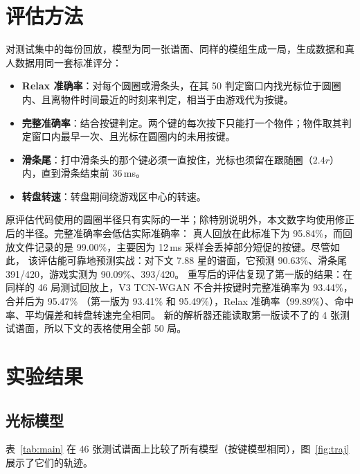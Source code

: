 \documentclass[11pt,a4paper,fontset=windows]{ctexart}
\begin{document}
\section{评估方法}
对测试集中的每份回放，模型为同一张谱面、同样的模组生成一局，生成数据和真人数据用同一套标准评分：
\begin{itemize}
  \item \textbf{Relax 准确率}：对每个圆圈或滑条头，在其 50 判定窗口内找光标位于圆圈内、且离物件时间最近的时刻来判定，相当于由游戏代为按键。
  \item \textbf{完整准确率}：结合按键判定。两个键的每次按下只能打一个物件；物件取其判定窗口内最早一次、且光标在圆圈内的未用按键。
  \item \textbf{滑条尾}：打中滑条头的那个键必须一直按住，光标也须留在跟随圈（$2.4r$）内，直到滑条结束前 36\,ms。
  \item \textbf{转盘转速}：转盘期间绕游戏区中心的转速。
\end{itemize}
原评估代码使用的圆圈半径只有实际的一半；除特别说明外，本文数字均使用修正后的半径。完整准确率会低估实际准确率：
真人回放在此标准下为 95.84\%，而回放文件记录的是 99.00\%，主要因为 12\,ms 采样会丢掉部分短促的按键。尽管如此，
该评估能可靠地预测实战：对下文 7.88 星的谱面，它预测 90.63\%、滑条尾 391/420，游戏实测为 90.09\%、393/420。
重写后的评估复现了第一版的结果：在同样的 46 局测试回放上，V3 TCN-WGAN 不合并按键时完整准确率为 93.44\%，合并后为 95.47\%
（第一版为 93.41\% 和 95.49\%），Relax 准确率（99.89\%）、命中率、平均偏差和转盘转速完全相同。
新的解析器还能读取第一版读不了的 4 张测试谱面，所以下文的表格使用全部 50 局。

\section{实验结果}
\subsection{光标模型}
表~\ref{tab:main} 在 46 张测试谱面上比较了所有模型（按键模型相同），图~\ref{fig:traj} 展示了它们的轨迹。
\end{document}
